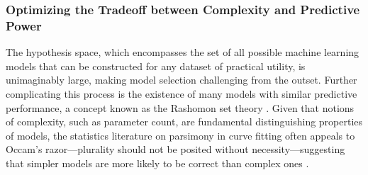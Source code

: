 \documentclass[12pt]{article}  %
\begin{document}
        \subsubsection{Optimizing the Tradeoff between Complexity and Predictive Power}
            \label{sec:decreasing_complexity}
            The hypothesis space, which encompasses the set of all possible machine learning models that can be constructed for any dataset of practical utility, is unimaginably large, making model selection challenging from the outset. Further complicating this process is the existence of many models with similar predictive performance, a concept known as the Rashomon set theory \citep{semenova22rashomon}. Given that notions of complexity, such as parameter count, are fundamental distinguishing properties of models, the statistics literature on parsimony in curve fitting often appeals to Occam's razor—plurality should not be posited without necessity—suggesting that simpler models are more likely to be correct than complex ones \citep{popper2005logic}.
\end{document}
